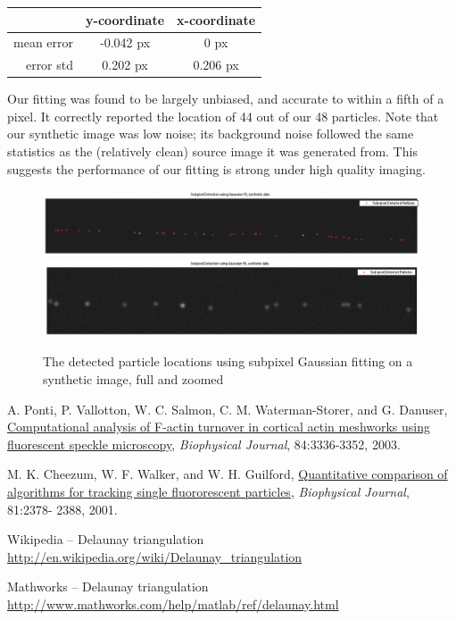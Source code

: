 \documentclass{article}
\begin{document}
\begin{center}
\begin{tabular}{r | c | c}
               & y-coordinate & x-coordinate \\ \hline
    mean error & -0.042 px      & 0 px       \\
    error std  & 0.202 px       & 0.206 px
\end{tabular}
\end{center}

Our fitting was found to be largely unbiased, and accurate to within a fifth of a pixel. It correctly reported the location of 44 out of our 48 particles. Note that our synthetic image was low noise; its background noise followed the same statistics as the (relatively clean) source image it was generated from. This suggests the performance of our fitting is strong under high quality imaging.

\begin{figure}[h]
\centering
\includegraphics[width=16cm]{figures/subpixel_synthetic_full.png}
\includegraphics[width=16cm]{figures/subpixel_synthetic_zoom.png}
\caption{The detected particle locations using subpixel Gaussian fitting on a
    synthetic image, full and zoomed}
\label{fig:subpixelSynthetic}
\end{figure}



\pagebreak
\begin{thebibliography}{9}
\fontsize{10pt}{12pt}\selectfont
\raggedright

        A. Ponti, P. Vallotton, W. C. Salmon, C. M. Waterman-Storer, and G.
        Danuser, \ul{Computational analysis of F-actin turnover in cortical
        actin meshworks using fluorescent speckle microscopy}, {\em Biophysical
        Journal}, 84:3336-3352, 2003.

        M. K. Cheezum, W. F. Walker, and W. H. Guilford, 
        \ul{Quantitative comparison of algorithms for tracking single 
        fluororescent particles}, {\em Biophysical Journal}, 81:2378- 2388, 2001.

        Wikipedia -- Delaunay triangulation
        \url{http://en.wikipedia.org/wiki/Delaunay_triangulation}
    
        Mathworks -- Delaunay triangulation
        \url{http://www.mathworks.com/help/matlab/ref/delaunay.html}

\end{thebibliography}


\end{document}
